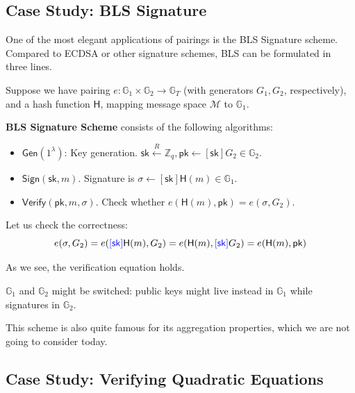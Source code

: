 \documentclass[../lecture-notes.tex]{subfiles}
\begin{document}
\subsection{Case Study: BLS Signature}

One of the most elegant applications of pairings is the BLS Signature scheme. Compared to ECDSA or other signature schemes, BLS can be formulated in three lines.

Suppose we have pairing $e: \mathbb{G}_1 \times \mathbb{G}_2 \to \mathbb{G}_T$ (with generators $G_1,G_2$, respectively), and a hash function $\mathsf{H}$, mapping message space $\mathcal{M}$ to $\mathbb{G}_1$.
\begin{definition}
    \textbf{BLS Signature Scheme} consists of the following algorithms:
    \begin{itemize}
        \item $\mathsf{Gen}(1^{\lambda})$: Key generation. $\mathsf{sk} \xleftarrow[]{R} \mathbb{Z}_q, \mathsf{pk} \gets [\mathsf{sk}] G_2 \in \mathbb{G}_2$.
        \item $\mathsf{Sign}(\mathsf{sk},m)$. Signature is $\sigma \gets [\mathsf{sk}] \mathsf{H}(m) \in \mathbb{G}_1$.
        \item $\mathsf{Verify}(\mathsf{pk},m,\sigma)$. Check whether $e(\mathsf{H}(m), \mathsf{pk}) = e(\sigma, G_2)$.
    \end{itemize}
\end{definition}
        
Let us check the correctness:
\begin{equation}
    e(\sigma,G_2) = e(\textcolor{blue}{[\mathsf{sk}]}\mathsf{H}(m),G_2) = e(\mathsf{H}(m), \textcolor{blue}{[\mathsf{sk}]}G_2) = e(\mathsf{H}(m), \mathsf{pk})
\end{equation}

As we see, the verification equation holds. 
    
\begin{remark}
    $\mathbb{G}_1$ and $\mathbb{G}_2$ might be switched: public keys might live instead in $\mathbb{G}_1$ while signatures in $\mathbb{G}_2$.        
\end{remark}

This scheme is also quite famous for its aggregation properties, which we are not going to consider today.

\subsection{Case Study: Verifying Quadratic Equations}
\end{document}
